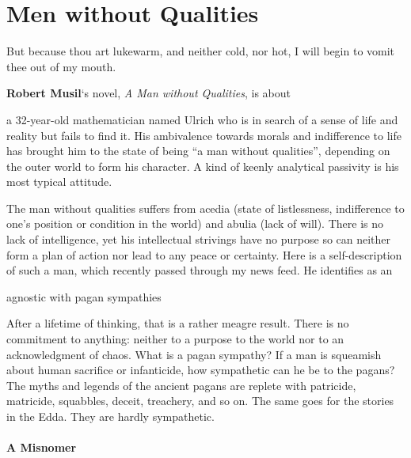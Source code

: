 \section{Men without Qualities}

\begin{quotex}
But because thou art lukewarm, and neither cold, nor hot, I will begin to vomit thee out of my mouth.
\end{quotex}


\textbf{Robert Musil}`s novel, \emph{A Man without Qualities}, is about


\begin{quotex}
a 32-year-old mathematician named Ulrich who is in search of a sense of life and reality but fails to find it. His ambivalence towards morals and indifference to life has brought him to the state of being ``a man without qualities'', depending on the outer world to form his character. A kind of keenly analytical passivity is his most typical attitude.
\end{quotex}


The man without qualities suffers from acedia (state of listlessness, indifference to one's position or condition in the world) and abulia (lack of will). There is no lack of intelligence, yet his intellectual strivings have no purpose so can neither form a plan of action nor lead to any peace or certainty. Here is a self-description of such a man, which recently passed through my news feed. He identifies as an

\begin{quotex}
agnostic with pagan sympathies
\end{quotex}


After a lifetime of thinking, that is a rather meagre result. There is no commitment to anything: neither to a purpose to the world nor to an acknowledgment of chaos. What is a pagan sympathy? If a man is squeamish about human sacrifice or infanticide, how sympathetic can he be to the pagans? The myths and legends of the ancient pagans are replete with patricide, matricide, squabbles, deceit, treachery, and so on. The same goes for the stories in the Edda. They are hardly sympathetic.

\paragraph{A Misnomer}


